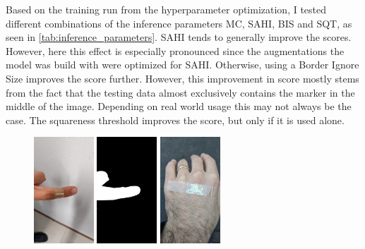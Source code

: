 \documentclass[10pt]{book}
\begin{document}
Based on the training run from the hyperparameter optimization, I tested different combinations of the inference parameters \ac{MC}, \ac{SAHI}, \ac{BIS} and \ac{SQT}, as seen in \autoref{tab:inference_parameters}. \ac{SAHI} tends to generally improve the scores. However, here this effect is especially pronounced since the augmentations the model was build with were optimized for \ac{SAHI}. Otherwise, using a Border Ignore Size improves the score further. However, this improvement in score mostly stems from the fact that the testing data almost exclusively contains the marker in the middle of the image. Depending on real world usage this may not always be the case. The squareness threshold improves the score, but only if it is used alone. 

\begin{figure}
  \centering
     {\includegraphics[width=0.2\textwidth]{image/foreground_mask_example_finger}}
     {\includegraphics[width=0.2\textwidth]{image/foreground_mask_example_finger_mask}}
     {\includegraphics[width=0.2\textwidth]{image/foreground_mask_example_hand}}

\end{figure}
\end{document}
